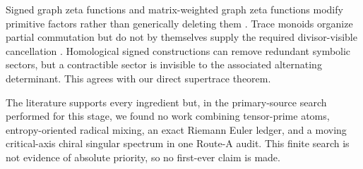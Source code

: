 Signed graph zeta functions and matrix-weighted graph zeta functions modify
primitive factors rather than generically deleting them
\citep{lihou2024,ohtasakaiwagatsuma2022}.  Trace monoids organize partial
commutation but do not by themselves supply the required divisor-visible
cancellation \citep{cartierfoata1999}.  Homological signed constructions can
remove redundant symbolic sectors, but a contractible sector is invisible
to the associated alternating determinant.  This agrees with our direct
supertrace theorem.

The literature supports every ingredient but, in the primary-source search
performed for this stage, we found no work combining tensor-prime atoms,
entropy-oriented radical mixing, an exact Riemann Euler ledger, and a moving
critical-axis chiral singular spectrum in one Route-A audit.  This finite
search is not evidence of absolute priority, so no first-ever claim is made.
